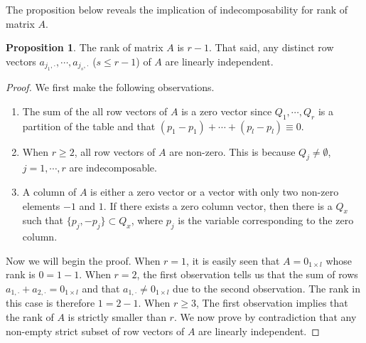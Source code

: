 \documentclass[11pt]{article}
\numberwithin{equation}{section}
\theoremstyle{plain}
\theoremstyle{definition}
\theoremstyle{definition}
\theoremstyle{assumption}
\theoremstyle{proposition}
\newtheorem{proposition}{Proposition}[section]
\theoremstyle{proposition}
\theoremstyle{example}
\theoremstyle{lemma}
\theoremstyle{theorem}
\theoremstyle{remark}
\begin{document}
The proposition below reveals the implication of indecomposability for rank of matrix $A$.
\begin{proposition}\label{indecomposable_partition_prop}
The rank of matrix $A$ is $r-1$. That said, any distinct row vectors $a_{j_1,\cdot},\cdots,a_{j_s,\cdot}$ ($s\leqslant r-1$) of $A$ are linearly independent.
\begin{proof}
We first make the following observations.
\begin{enumerate}
\item The sum of the all row vectors of $A$ is a zero vector since $Q_1,\cdots,Q_r$ is a partition of the table and that $(p_1-p_1)+\cdots+(p_l-p_l)\equiv0$.
\item When $r\geqslant2$, all row vectors of $A$ are non-zero. This is because $Q_j\neq\emptyset$, $j=1,\cdots,r$ are indecomposable.
\item A column of $A$ is either a zero vector or a vector with only two non-zero elements $-1$ and $1$. If there exists a zero column vector, then there is a $Q_x$ such that $\{p_j, -p_j\}\subset Q_x$, where $p_j$ is the variable corresponding to the zero column.
\end{enumerate}
Now we will begin the proof. When $r=1$, it is easily seen that $A=0_{1\times l}$ whose rank is $0=1-1$. When $r=2$, the first observation tells us that the sum of rows $a_{1,\cdot}+a_{2,\cdot}=0_{1\times l}$ and that $a_{1,\cdot}\neq 0_{1\times l}$ due to the second observation. The rank in this case is therefore $1=2-1$. When $r\geqslant 3$, The first observation implies that the rank of $A$ is strictly smaller than $r$. We now prove by contradiction that any non-empty strict subset of row vectors of $A$ are linearly independent.


\end{proof}
\end{proposition}
\end{document}

